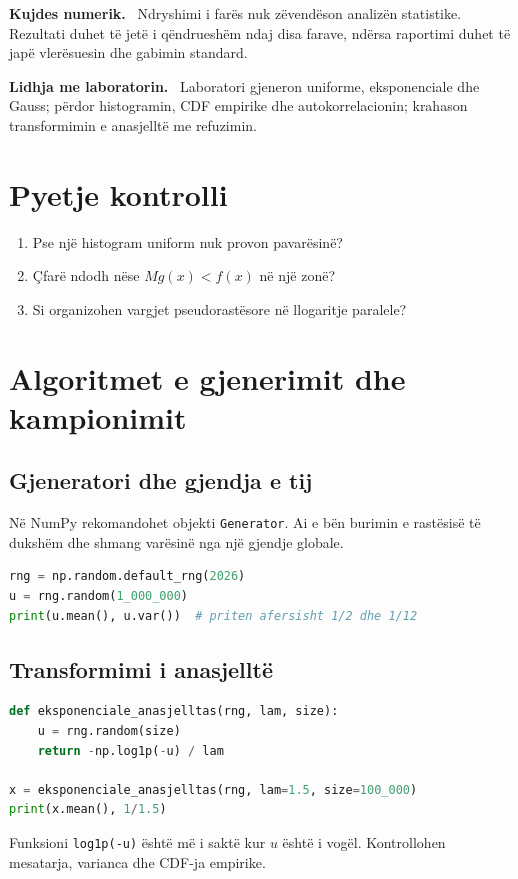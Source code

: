 \documentclass[11pt,oneside,openany]{book}
\newenvironment{kujdes}{\par\medskip\noindent\textbf{Kujdes numerik.}\ }{\par\medskip}
\newenvironment{lidhje}{\par\medskip\noindent\textbf{Lidhja me laboratorin.}\ }{\par\medskip}
\begin{document}
\begin{kujdes}
Ndryshimi i farës nuk zëvendëson analizën statistike. Rezultati duhet të jetë i qëndrueshëm ndaj disa farave, ndërsa raportimi duhet të japë vlerësuesin dhe gabimin standard.
\end{kujdes}

\begin{lidhje}
Laboratori gjeneron uniforme, eksponenciale dhe Gauss; përdor histogramin, CDF empirike dhe autokorrelacionin; krahason transformimin e anasjelltë me refuzimin.
\end{lidhje}

\section*{Pyetje kontrolli}
\begin{enumerate}
\item Pse një histogram uniform nuk provon pavarësinë?
\item Çfarë ndodh nëse $Mg(x)<f(x)$ në një zonë?
\item Si organizohen vargjet pseudorastësore në llogaritje paralele?
\end{enumerate}

\section{Algoritmet e gjenerimit dhe kampionimit}
\subsection{Gjeneratori dhe gjendja e tij}
Në NumPy rekomandohet objekti \texttt{Generator}. Ai e bën burimin e rastësisë të dukshëm dhe shmang varësinë nga një gjendje globale.
\begin{lstlisting}[language=Python]
rng = np.random.default_rng(2026)
u = rng.random(1_000_000)
print(u.mean(), u.var())  # priten afersisht 1/2 dhe 1/12
\end{lstlisting}

\subsection{Transformimi i anasjelltë}
\begin{lstlisting}[language=Python,caption={Mostra eksponenciale pa përdorur funksionin e gatshëm.}]
def eksponenciale_anasjelltas(rng, lam, size):
    u = rng.random(size)
    return -np.log1p(-u) / lam

x = eksponenciale_anasjelltas(rng, lam=1.5, size=100_000)
print(x.mean(), 1/1.5)
\end{lstlisting}
Funksioni \texttt{log1p(-u)} është më i saktë kur $u$ është i vogël. Kontrollohen mesatarja, varianca dhe CDF-ja empirike.
\end{document}
